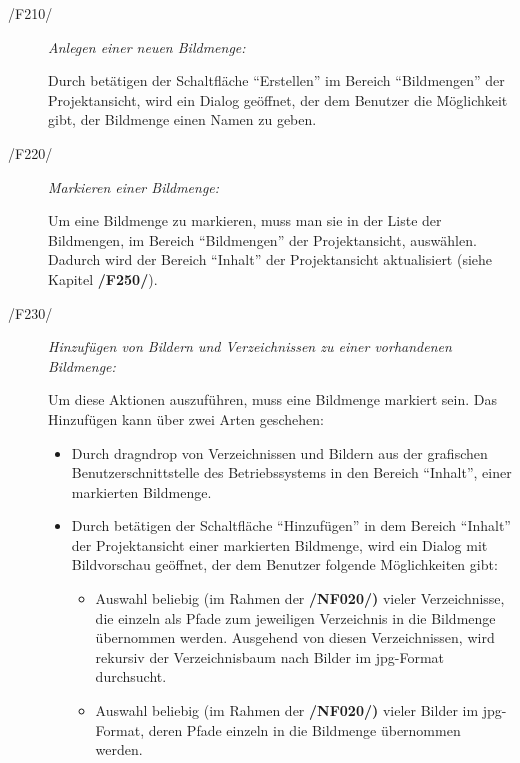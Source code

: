 	\begin{description}
		
		\item[/F210/] \textit{Anlegen einer neuen Bildmenge:}\par Durch betätigen der Schaltfläche "`Erstellen"' im Bereich "`Bildmengen"' der Projektansicht, wird ein Dialog geöffnet, der dem Benutzer die Möglichkeit gibt, der Bildmenge einen Namen zu geben.
		
		\item[/F220/] \textit{Markieren einer Bildmenge:}\par Um eine Bildmenge zu markieren, muss man sie in der Liste der Bildmengen, im Bereich "`Bildmengen"' der Projektansicht, auswählen. Dadurch wird der Bereich "`Inhalt"' der Projektansicht aktualisiert (siehe Kapitel \textbf{/F250/}).
		
		\item[/F230/] \textit{Hinzufügen von Bildern und Verzeichnissen zu einer vorhandenen Bildmenge:}\par Um diese Aktionen auszuführen, muss eine Bildmenge markiert sein. Das Hinzufügen kann über zwei Arten geschehen:
		
			\begin{itemize}
				
				\item Durch \gls{dragndrop} von Verzeichnissen und Bildern aus der grafischen Benutzerschnittstelle des Betriebssystems in den Bereich "`Inhalt"', einer markierten Bildmenge. 
				
				\item Durch betätigen der Schaltfläche "`Hinzufügen"' in dem Bereich "`Inhalt"' der Projektansicht einer markierten Bildmenge, wird ein Dialog mit Bildvorschau geöffnet, der dem Benutzer folgende Möglichkeiten gibt:
				
					\begin{itemize}
			
						\item Auswahl beliebig (im Rahmen der \textbf{/NF020/)} vieler Verzeichnisse, die einzeln als Pfade zum jeweiligen Verzeichnis in die Bildmenge übernommen werden. Ausgehend von diesen Verzeichnissen, wird rekursiv der Verzeichnisbaum nach Bilder im \gls{jpg}-Format durchsucht.
						
						\item Auswahl beliebig (im Rahmen der \textbf{/NF020/)} vieler Bilder im \gls{jpg}-Format, deren Pfade einzeln in die Bildmenge übernommen werden.
					

\end{itemize}
\end{itemize}
\end{description}
